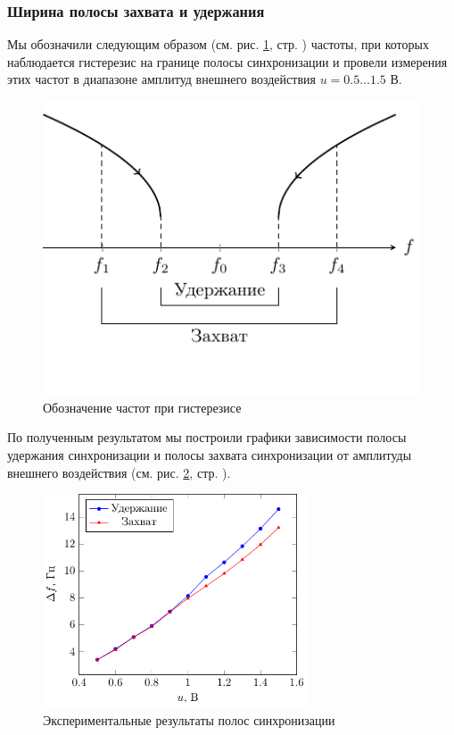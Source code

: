 \documentclass[a4paper,14pt]{extarticle}
\begin{document}
\subsubsection{Ширина полосы захвата и удержания}

Мы обозначили следующим образом (см. рис. \ref{fig:band}, стр. \pageref{fig:band}) частоты, при которых наблюдается гистерезис на границе полосы синхронизации и провели измерения этих частот в диапазоне амплитуд внешнего воздействия $u=0.5\ldots 1.5$ В.
\begin{figure}[h!]
	\centering
	\includegraphics[scale=1.5]{fig/band.pdf}
	\vspace{-2em}
	\caption{Обозначение частот при гистерезисе}
	\label{fig:band}
\end{figure}
По полученным результатом мы построили графики зависимости полосы удержания синхронизации и полосы захвата синхронизации от амплитуды внешнего воздействия (см. рис. \ref{fig:band2}, стр. \pageref{fig:band2}).
\begin{figure}[h!]
	\centering
	\includegraphics[width=0.7\textwidth]{plot/band.pdf}
	\vspace{-1em}
	\caption{Экспериментальные результаты полос синхронизации}
	\label{fig:band2}
\end{figure}
\end{document}
